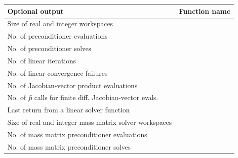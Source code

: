 \documentclass[letterpaper,10pt,english]{sphinxmanual}
\begin{document}
\begin{tabulary}{\linewidth}{|L|L|}
\hline
\textbf{
Optional output
} & \textbf{
Function name
}\\\hline

Size of real and integer workspaces
 & 
{\hyperref[c_interface/User_callable:ARKSpilsGetWorkSpace]{}}
\\\hline

No. of preconditioner evaluations
 & 
{\hyperref[c_interface/User_callable:ARKSpilsGetNumPrecEvals]{}}
\\\hline

No. of preconditioner solves
 & 
{\hyperref[c_interface/User_callable:ARKSpilsGetNumPrecSolves]{}}
\\\hline

No. of linear iterations
 & 
{\hyperref[c_interface/User_callable:ARKSpilsGetNumLinIters]{}}
\\\hline

No. of linear convergence failures
 & 
{\hyperref[c_interface/User_callable:ARKSpilsGetNumConvFails]{}}
\\\hline

No. of Jacobian-vector product evaluations
 & 
{\hyperref[c_interface/User_callable:ARKSpilsGetNumJtimesEvals]{}}
\\\hline

No. of \emph{fi} calls for finite diff. Jacobian-vector evals.
 & 
{\hyperref[c_interface/User_callable:ARKSpilsGetNumRhsEvals]{}}
\\\hline

Last return from a linear solver function
 & 
{\hyperref[c_interface/User_callable:ARKSpilsGetLastFlag]{}}
\\\hline

Size of real and integer mass matrix solver workspaces
 & 
{\hyperref[c_interface/User_callable:ARKSpilsGetMassWorkSpace]{}}
\\\hline

No. of mass matrix preconditioner evaluations
 & 
{\hyperref[c_interface/User_callable:ARKSpilsGetNumMassPrecEvals]{}}
\\\hline

No. of mass matrix preconditioner solves
 & 
{\hyperref[c_interface/User_callable:ARKSpilsGetNumMassPrecSolves]{}}
\\\hline


\end{tabulary}
\end{document}
